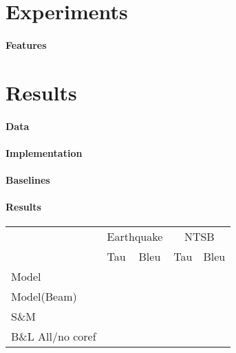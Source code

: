\section{Experiments}

\paragraph{Features}



\section{Results}

\paragraph{Data}


\paragraph{Implementation}


\paragraph{Baselines}


\paragraph{Results}


\begin{table*}
  \centering
  \begin{tabular}{|l|ll|ll|}
    \hline
    & \multicolumn{2}{c|}{Earthquake} & \multicolumn{2}{c|}{NTSB} \\
    & Tau & Bleu & Tau & Bleu \\
    \hline
    Model & & \\
    Model(Beam) & & \\
    S\&M & & \\
    B\&L All/no coref & & \\
    \hline
  \end{tabular}
\end{table*}


